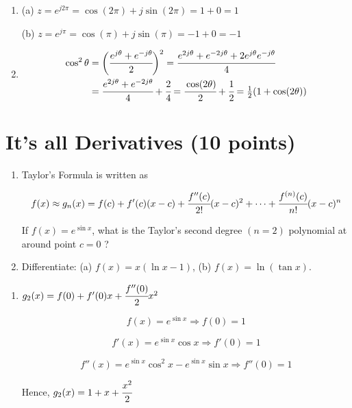 \documentclass[12pt, xcolor=dvipsnames,svgnames,x11names]{article}
\begin{document}
\begin{answerbox}

\begin{enumerate}
    \item (a) $z = e^{j2\pi}= \cos(2\pi ) + j\sin(2\pi) = 1 + 0 = 1$

    (b) $z =e^{j\pi} =  \cos(\pi) + j\sin(\pi) = -1 + 0 = -1$
    \item \begin{equation*}
        \begin{aligned}
            \cos^2\theta & = \bigg( \cfrac{e^{j\theta} + e^{-j\theta}}{2}\bigg)^2 = \cfrac{e^{2j\theta} + e^{-2j\theta} + 2e^{j\theta} e^{-j\theta}}{4} \\& = \cfrac{e^{2j\theta} + e^{-2j\theta}}{4} + \cfrac{2}{4} =  \cfrac{\cos(2\theta)}{2} + \cfrac{1}{2} = \tfrac{1}{2}( 1 + \cos (2\theta))
        \end{aligned}
    \end{equation*}
\end{enumerate}


\end{answerbox}

   \section{It's all Derivatives (10 points)}
   \begin{enumerate}
      \item Taylor’s Formula is written as

   $$
   f(x) \approx g_n(x) = f(c) + f'(c)(x-c) + \cfrac{f''(c)}{2!}(x-c)^2 + \cdots + \cfrac{f^{(n)}(c)}{n!}(x-c)^n
   $$


   If $f(x) = e^{\sin x}$, what is the Taylor’s second degree $(n = 2)$ polynomial at around point $c = 0$ ?

   \item Differentiate: (a) $f(x) = x( \ln x - 1)$, (b) $f(x) = \ln (\tan x)$.
   \end{enumerate}
   
   
   \begin{answerbox}
   
   \begin{enumerate}
    \item $g_2 (x) = f(0) + f'(0) x + \cfrac{f''(0)}{2}x^2$

    $$
    f(x) = e^{\sin x} \Rightarrow f(0) = 1
    $$

    $$
    f'(x) = e^{\sin x}\cos x \Rightarrow f'(0) = 1
    $$

    $$
    f''(x) = e^{\sin x} \cos^2 x - e^{\sin x}\sin x \Rightarrow f''(0) = 1
    $$

    Hence, $g_2(x) = 1 + x + \cfrac{x^2}{2}$
\end{enumerate}

   \end{answerbox}
\end{document}
